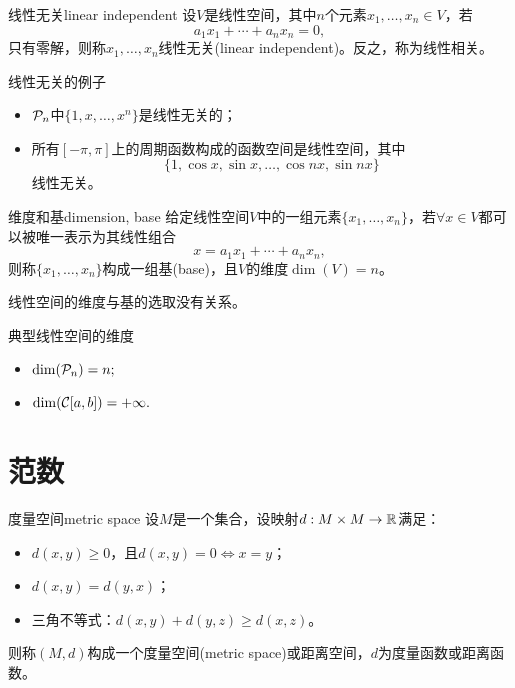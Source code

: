\begin{definition}
    {线性无关}{linear independent}
    设$V$是线性空间，其中$n$个元素$x_1,\ldots,x_n\in V$，若%
    \begin{equation}
        a_1x_1+\cdots+a_nx_n=0,
    \end{equation}
    只有零解，则称$x_1,\ldots,x_n$线性无关(linear independent)。反之，称为线性相关。
\end{definition}

\begin{example}
    {线性无关的例子}{}
    \begin{itemize}
        \item $\mathcal P_n$中$\{1,x,\ldots,x^n\}$是线性无关的；
        \item 所有$[-\pi,\pi]$上的周期函数构成的函数空间是线性空间，其中
        \[
            \{1,\cos x,\sin x,\ldots,\cos nx,\sin nx\} 
        \]
        线性无关。
    \end{itemize}
\end{example}

\begin{definition}
    {维度和基}{dimension, base}
    给定线性空间$V$中的一组元素$\{x_1,\ldots,x_n\}$，若$\forall x\in V$都可以被唯一表示为其线性组合
    \begin{equation}
        x=a_1x_1+\cdots+a_nx_n,
    \end{equation}
    则称$\{x_1,\ldots,x_n\}$构成一组基(base)，且$V$的维度$\dim(V)=n$。
\end{definition}

\begin{theorem}
    {}{}
    线性空间的维度与基的选取没有关系。
\end{theorem}

\begin{example}
    {典型线性空间的维度}{}
    \begin{itemize}
        \item $\dim(\mathcal P_n)=n;$
        \item $\dim(\mathcal C[a,b])=+\infty.$
    \end{itemize}
\end{example}

\section{范数}
\label{sec:norm}

\begin{definition}
    {度量空间}{metric space}
    设$M$是一个集合，设映射$d:M\times M\to\mathbb R$满足：
    \begin{itemize}
        \item $d(x,y)\geq 0$，且$d(x,y)=0\iff x=y$；
        \item $d(x,y)=d(y,x)$；
        \item 三角不等式：$d(x,y)+d(y,z)\geq d(x,z)$。
    \end{itemize}
    则称$(M,d)$构成一个度量空间(metric space)或距离空间，$d$为度量函数或距离函数。
\end{definition}

